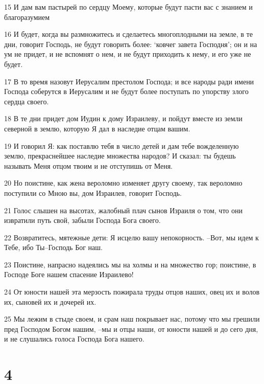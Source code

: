 \par 15 И дам вам пастырей по сердцу Моему, которые будут пасти вас с знанием и благоразумием
\par 16 И будет, когда вы размножитесь и сделаетесь многоплодными на земле, в те дни, говорит Господь, не будут говорить более: `ковчег завета Господня'; он и на ум не придет, и не вспомнят о нем, и не будут приходить к нему, и его уже не будет.
\par 17 В то время назовут Иерусалим престолом Господа; и все народы ради имени Господа соберутся в Иерусалим и не будут более поступать по упорству злого сердца своего.
\par 18 В те дни придет дом Иудин к дому Израилеву, и пойдут вместе из земли северной в землю, которую Я дал в наследие отцам вашим.
\par 19 И говорил Я: как поставлю тебя в число детей и дам тебе вожделенную землю, прекраснейшее наследие множества народов? И сказал: ты будешь называть Меня отцом твоим и не отступишь от Меня.
\par 20 Но поистине, как жена вероломно изменяет другу своему, так вероломно поступили со Мною вы, дом Израилев, говорит Господь.
\par 21 Голос слышен на высотах, жалобный плач сынов Израиля о том, что они извратили путь свой, забыли Господа Бога своего.
\par 22 Возвратитесь, мятежные дети: Я исцелю вашу непокорность. --Вот, мы идем к Тебе, ибо Ты--Господь Бог наш.
\par 23 Поистине, напрасно надеялись мы на холмы и на множество гор; поистине, в Господе Боге нашем спасение Израилево!
\par 24 От юности нашей эта мерзость пожирала труды отцов наших, овец их и волов их, сыновей их и дочерей их.
\par 25 Мы лежим в стыде своем, и срам наш покрывает нас, потому что мы грешили пред Господом Богом нашим, --мы и отцы наши, от юности нашей и до сего дня, и не слушались голоса Господа Бога нашего.

\chapter{4}

